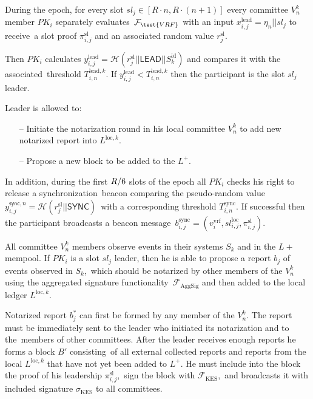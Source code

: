 \begin{legal}
    \item During the epoch, for every slot $sl_j \in [R\cdot n, R\cdot(n+1)]$ every committee $V^k_n$ member $PK_i$ separately evaluates\
    ${\mathcal{F}}_{\test{VRF}}$ with an input ${x_{i, j}^{\text{lead}} = \eta_n || sl_j}$ to receive\
    a slot proof $\pi_{i, j}^{\text{sl}}$ and an associated random value $r_{j}^{\text{sl}}$.

    Then $PK_i$ calculates ${y_{i, j}^{\text{lead}} = \mathcal{H}(r_{j}^{\text{sl}}||\textsf{LEAD}||S_k^{\text{id}})}$ and compares it with the associated\
    threshold $T_{i, n}^{\text{lead}, k}$.
    If $y_{i, j}^{\text{lead}} < T_{i, n}^{\text{lead}, k}$ then the participant is the slot $sl_j$ leader.

    \bigskip
    Leader is allowed to:
    \begin{itemize}
        \item [--] Initiate the notarization round in his local committee $V^k_n$ to add new notarized report into $L^{\text{loc}, k}$.
        \item[--] Propose a new block to be added to the $L^+$.
    \end{itemize}

    \bigskip
    In addition, during the first $R\//6$ slots of the epoch all $PK_i$ checks his right to release a synchronization\
    beacon comparing the pseudo-random value\
    ${y_{i, j}^{\textsf{sync}, n} = \mathcal{H}(r_{j}^{\text{sl}} || \textsf{SYNC})}$\
    with a corresponding threshold $T_{i, n}^{\text{sync}}$.
    If successful then the participant broadcasts a beacon message\
    $b_{i, j}^{\text{sync}} = (v^{\text{vrf}}_i, sl_{i, j}^{\text{loc}}, \pi_{i, j}^{\text{sl}})$.

    \item All committee $V^k_n$ members observe events in their systems $S_k$ and in the $L+$ mempool.
    If $PK_i$ is a slot $sl_j$ leader, then he is able to propose a report $b_j$ of events observed in $S_k$,\
    which should be notarized by other members of the $V^k_n$ using the aggregated signature functionality\
    ${\mathcal{F}}_{\text{AggSig}}$ and then added to the local ledger $L^{\text{loc}, k}$.

    \item Notarized report $b_j^*$ can first be formed by any member of the $V^k_n$.
    The report must be immediately sent to the leader who initiated its notarization and to the\
    members of other committees.
    After the leader receives enough reports he forms a block  $B'$ consisting\
    of all external collected reports and reports from the local $L^{\text{loc}, k}$ that have not yet been added to $L^+$.
    He must include into the block the proof of his leadership $ \pi_{i, j}^{\text{sl}}$,\
    sign the block with ${\mathcal{F}}_{\text{KES}}$,\
    and broadcasts it with included signature $\sigma_{\text{KES}}$ to all committees.


\end{legal}
